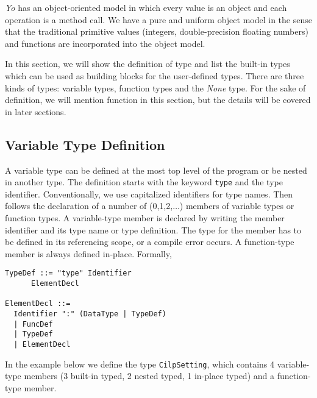 \documentclass[12pt]{article}
\begin{document}
\textit{Yo} has an object-oriented model in which every value is an object and each operation is a method call. We have a pure and uniform object model in the sense that the traditional primitive values (integers, double-precision floating numbers) and functions are incorporated into the object model.

In this section, we will show the definition of type and list the built-in types which can be used as building blocks for the user-defined types. %
There are three kinds of types: variable types, function types and the \textit{None} type. For the sake of definition, we will mention function in this section, but the details will be covered in later sections.

\subsection{Variable Type Definition} %

A variable type can be defined at the most top level of the program or be nested in another type. The definition starts with the keyword \texttt{type} and the type identifier. Conventionally, we use capitalized identifiers for type names. Then follows the declaration of a number of (0,1,2,$\dots$) members of variable types or function types. A variable-type member is declared by writing the member identifier and its type name or type definition. The type for the member has to be defined in its referencing scope, or a compile error occurs. A function-type member is always defined in-place. Formally,

\begin{lstlisting}[caption=Type Definition Syntax]
TypeDef ::= "type" Identifier
      ElementDecl
            
ElementDecl ::=  
  Identifier ":" (DataType | TypeDef)
  | FuncDef
  | TypeDef
  | ElementDecl
\end{lstlisting}

In the example below we define the type \texttt{CilpSetting}, which contains 4 variable-type members (3 built-in typed, 2 nested typed, 1 in-place typed) and a function-type member.
\end{document}
